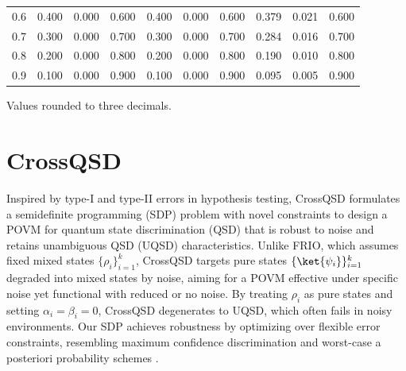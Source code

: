 \begin{table}[t]
\begin{tabular}{@{}r|rrr|rrr|rrr@{}}
        0.6                                      & 0.400                              & 0.000     & 0.600     & 0.400 & 0.000 & 0.600 & 0.379 & 0.021 & 0.600 \\
        0.7                                      & 0.300                              & 0.000     & 0.700     & 0.300 & 0.000 & 0.700 & 0.284 & 0.016 & 0.700 \\
        0.8                                      & 0.200                              & 0.000     & 0.800     & 0.200 & 0.000 & 0.800 & 0.190 & 0.010 & 0.800 \\
        0.9                                      & 0.100                              & 0.000     & 0.900     & 0.100 & 0.000 & 0.900 & 0.095 & 0.005 & 0.900 \\
        \bottomrule
    \end{tabular}

    \par\vspace{2pt}\footnotesize
    Values rounded to three decimals.
\end{table}

\section{CrossQSD}
\label{sec:crossqsd}
Inspired by type-I and type-II errors in hypothesis testing, CrossQSD
formulates a semidefinite programming (SDP) problem with novel constraints to
design a POVM for quantum state discrimination (QSD) that is robust to noise
and retains unambiguous QSD (UQSD) characteristics.
Unlike FRIO, which assumes fixed mixed states \(\{ \rho_i \}_{i=1}^k\),
CrossQSD targets pure states \(\{ \ket{\psi_i} \}_{i=1}^k\) degraded into
mixed states by noise, aiming for a POVM effective under specific noise yet
functional with reduced or no noise.
By treating \(\rho_i\) as pure states and setting \(\alpha_i = \beta_i = 0\),
CrossQSD degenerates to UQSD, which often fails in noisy environments.
Our SDP achieves robustness by optimizing over flexible error constraints,
resembling maximum confidence discrimination \cite{RN519} and worst-case a
posteriori probability schemes \cite{kosut2004quantumstatedetectordesign}.

